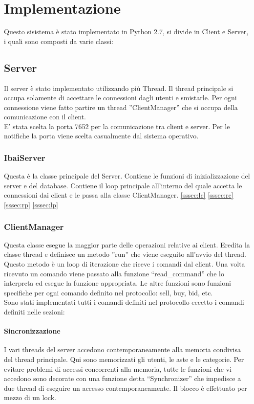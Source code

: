 \section{Implementazione}
Questo sisistema è stato implementato in Python 2.7, si divide in Client e Server, i quali sono composti da varie classi:
\subsection{Server}
Il server è stato implementato utilizzando più Thread. Il thread principale si occupa solamente di accettare le connessioni dagli utenti e smistarle. Per ogni connessione viene fatto partire un thread ''ClientManager'' che si occupa della comunicazione con il client.\\
E' stata scelta la porta 7652 per la comunicazione tra client e server. Per le notifiche la porta viene scelta casualmente dal sistema operativo.
\subsubsection{IbaiServer}
Questa è la classe principale del Server. Contiene le funzioni di inizializzazione del server e del database.
Contiene il loop principale all'interno del quale accetta le connessioni dai client e le passa alla classe ClientManager.
\ref{sssec:lc} \ref{sssec:rc} \ref{sssec:rp}  \ref{sssec:lp} 
\subsubsection{ClientManager}
Questa classe esegue la maggior parte delle operazioni relative ai client. Eredita la classe thread e definisce un metodo ''run'' che viene  eseguito all'avvio del thread.\\
Questo metodo è un loop di iterazione che riceve i comandi dal client. Una volta ricevuto un comando viene passato alla funzione “read\_command” che lo interpreta ed esegue la funzione appropriata. Le altre funzioni sono funzioni specifiche per ogni comando definito nel protocollo: sell, buy, bid, etc.\\
Sono stati implementati tutti i comandi definiti nel protocollo eccetto i comandi definiti nelle sezioni: 
\paragraph{\textbf{Sincronizzazione}}
I vari threads del server accedono contemporaneamente alla memoria condivisa del thread principale. Qui sono memorizzati gli utenti, le aste e le categorie. Per evitare problemi di accessi concorrenti alla memoria, tutte le funzioni che vi accedono sono decorate con una funzione detta ``Synchronizer'' che impedisce a due thread di eseguire un accesso contemporaneamente. Il blocco è effettuato per mezzo di un lock.

